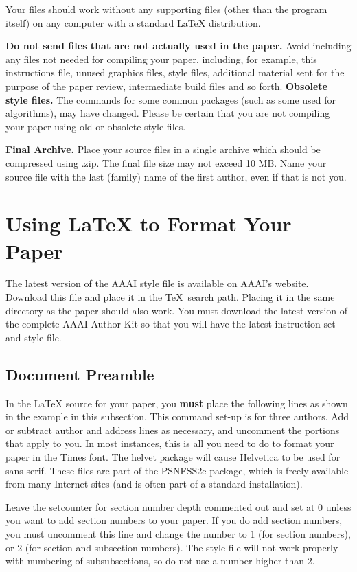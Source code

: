 \documentclass[letterpaper]{article} %
\begin{document}
Your files should work without any supporting files (other than the program itself) on any computer with a standard \LaTeX{} distribution.

\textbf{Do not send files that are not actually used in the paper.} Avoid including any files not needed for compiling your paper, including, for example, this instructions file, unused graphics files, style files, additional material sent for the purpose of the paper review, intermediate build files and so forth.
\textbf{Obsolete style files.} The commands for some common packages (such as some used for algorithms), may have changed. Please be certain that you are not compiling your paper using old or obsolete style files.

\textbf{Final Archive.} Place your source files in a single archive which should be compressed using .zip. The final file size may not exceed 10 MB.
Name your source file with the last (family) name of the first author, even if that is not you.


\section{Using \LaTeX{} to Format Your Paper}

The latest version of the AAAI style file is available on AAAI's website. Download this file and place it in the \TeX\ search path. Placing it in the same directory as the paper should also work. You must download the latest version of the complete AAAI Author Kit so that you will have the latest instruction set and style file.

\subsection{Document Preamble}

In the \LaTeX{} source for your paper, you \textbf{must} place the following lines as shown in the example in this subsection. This command set-up is for three authors. Add or subtract author and address lines as necessary, and uncomment the portions that apply to you. In most instances, this is all you need to do to format your paper in the Times font. The helvet package will cause Helvetica to be used for sans serif. These files are part of the PSNFSS2e package, which is freely available from many Internet sites (and is often part of a standard installation).

Leave the setcounter for section number depth commented out and set at 0 unless you want to add section numbers to your paper. If you do add section numbers, you must uncomment this line and change the number to 1 (for section numbers), or 2 (for section and subsection numbers). The style file will not work properly with numbering of subsubsections, so do not use a number higher than 2.
\end{document}
